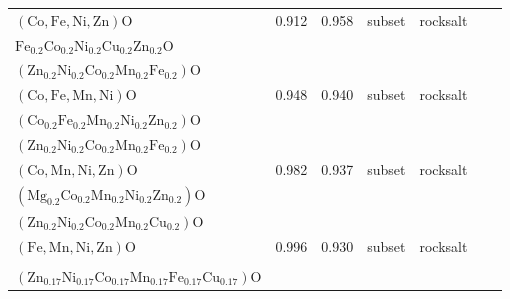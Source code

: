 \begin{table}
{\begin{tabular}{lcccccr}
$(\mathrm{Co},\mathrm{Fe},\mathrm{Ni},\mathrm{Zn})\mathrm{O}$ & 0.912 & 0.958 & subset & rocksalt & \makecell{$(\mathrm{Co}_{0.2}\mathrm{Fe}_{0.2}\mathrm{Mn}_{0.2}\mathrm{Ni}_{0.2}\mathrm{Zn}_{0.2})\mathrm{O}$\\
$\mathrm{Fe}_{0.2}\mathrm{Co}_{0.2}\mathrm{Ni}_{0.2}\mathrm{Cu}_{0.2}\mathrm{Zn}_{0.2}\mathrm{O}$\\
$(\mathrm{Zn}_{0.2}\mathrm{Ni}_{0.2}\mathrm{Co}_{0.2}\mathrm{Mn}_{0.2}\mathrm{Fe}_{0.2})\mathrm{O}$}  & \cite{Kirakosyan_RockSaltSpinel_ChemicalEngineeringJournal_2025,He_LithiumStorage_NanoResearch_2025,Lin_MechanochemicalSynthesis_JournalofMaterialsScience_2020} \\
$(\mathrm{Co},\mathrm{Fe},\mathrm{Mn},\mathrm{Ni})\mathrm{O}$ & 0.948 & 0.940 & subset & rocksalt & \makecell{$(\mathrm{Co},\mathrm{Fe},\mathrm{Mg},\mathrm{Mn},\mathrm{Ni})\mathrm{O}$\\
$(\mathrm{Co}_{0.2}\mathrm{Fe}_{0.2}\mathrm{Mn}_{0.2}\mathrm{Ni}_{0.2}\mathrm{Zn}_{0.2})\mathrm{O}$\\
$(\mathrm{Zn}_{0.2}\mathrm{Ni}_{0.2}\mathrm{Co}_{0.2}\mathrm{Mn}_{0.2}\mathrm{Fe}_{0.2})\mathrm{O}$} & ~\cite{Sivak_HighEntropy_PhysicalReviewLetters_2025,pu2023mg,Kirakosyan_RockSaltSpinel_ChemicalEngineeringJournal_2025,Lin_MechanochemicalSynthesis_JournalofMaterialsScience_2020} \\
$(\mathrm{Co},\mathrm{Mn},\mathrm{Ni},\mathrm{Zn})\mathrm{O}$ & 0.982 & 0.937 & subset & rocksalt & \makecell{$(\mathrm{Co}_{0.2}\mathrm{Fe}_{0.2}\mathrm{Mn}_{0.2}\mathrm{Ni}_{0.2}\mathrm{Zn}_{0.2})\mathrm{O}$\\
$(\mathrm{Mg}_{0.2}\mathrm{Co}_{0.2}\mathrm{Mn}_{0.2}\mathrm{Ni}_{0.2}\mathrm{Zn}_{0.2})\mathrm{O}$\\
$(\mathrm{Zn}_{0.2}\mathrm{Ni}_{0.2}\mathrm{Co}_{0.2}\mathrm{Mn}_{0.2}\mathrm{Cu}_{0.2})\mathrm{O}$}  & ~\cite{Kirakosyan_RockSaltSpinel_ChemicalEngineeringJournal_2025,Hou_ReversibilityAnodes_NanoEnergy_2024,Lin_MechanochemicalSynthesis_JournalofMaterialsScience_2020}  \\
$(\mathrm{Fe},\mathrm{Mn},\mathrm{Ni},\mathrm{Zn})\mathrm{O}$ & 0.996 & 0.930 & subset & rocksalt & \makecell{$(\mathrm{Co}_{0.2}\mathrm{Fe}_{0.2}\mathrm{Mn}_{0.2}\mathrm{Ni}_{0.2}\mathrm{Zn}_{0.2})\mathrm{O}$\\
\makecell{$(\mathrm{Zn}_{0.2}\mathrm{Ni}_{0.2}\mathrm{Co}_{0.2}\mathrm{Mn}_{0.2}\mathrm{Fe}_{0.2})\mathrm{O}$\\
$(\mathrm{Zn}_{0.17}\mathrm{Ni}_{0.17}\mathrm{Co}_{0.17}\mathrm{Mn}_{0.17}\mathrm{Fe}_{0.17}\mathrm{Cu}_{0.17})\mathrm{O}$}} & ~\cite{Kirakosyan_RockSaltSpinel_ChemicalEngineeringJournal_2025,Lin_MechanochemicalSynthesis_JournalofMaterialsScience_2020} \\

\end{tabular}}
\end{table}
